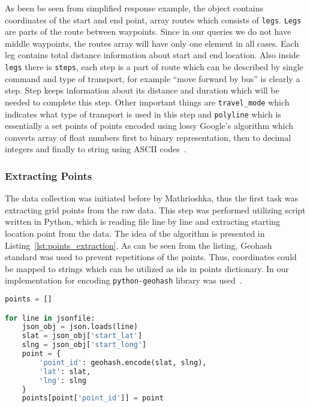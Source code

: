 As been be seen from simplified response example, the object contains coordinates of the
start and end point, array routes which consists of \texttt{legs}. \texttt{Legs} are parts of the
route between waypoints. Since in our queries we do not have middle waypoints, the routes array will have
only one element in all cases. Each leg contains total distance information about start and end
location. Also inside \texttt{legs} there is \texttt{steps}, each step is a part of route
which can be described by single command and type of transport, for example ``move forward by bus''
is clearly a step. Step keeps information about its distance and duration which will be needed
to complete this step. Other important things are \texttt{travel\_mode} which indicates what
type of transport is used in this step and \texttt{polyline} which is essentially a set points
of points encoded using lossy Google's algorithm which converts array of float numbers first
to binary representation, then to decimal integers and finally to string using ASCII
codes~\cite{google:polyline}.

\subsubsection{ Extracting Points }

The data collection was initiated before by Mathrioshka, thus the first task was extracting
grid points from the raw data. This step was performed utilizing script written in Python, which
is reading file line by line and extracting starting location point from the data. The
idea of the algorithm is presented in Listing~\ref{lst:points_extraction}. As can be seen from
the listing, Geohash~\cite{wiki:geohash} standard was used to prevent repetitions of the points.
Thus, coordinates could be mapped to strings which can be utilized as ids in points dictionary.
In our implementation for encoding \lstinline{python-geohash} library was used~\cite{pip:geohash}.

\begin{lstlisting}[language=python, caption=Points extraction, label={lst:points_extraction}]
points = []

for line in jsonfile:
    json_obj = json.loads(line)
    slat = json_obj['start_lat']
    slng = json_obj['start_long']
    point = {
        'point_id': geohash.encode(slat, slng),
        'lat': slat,
        'lng': slng
    }
    points[point['point_id']] = point
\end{lstlisting}

